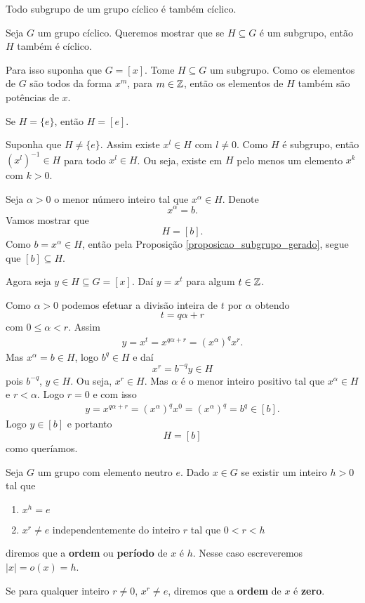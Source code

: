 \begin{proposicao}
    Todo subgrupo de um grupo cíclico é também cíclico.
\end{proposicao}
\begin{prova}
    Seja $G$ um grupo cíclico. Queremos mostrar que se $H \subseteq G$ é um subgrupo, então $H$ também é cíclico.

    Para isso suponha que $G = [x]$. Tome $H \subseteq G$ um subgrupo. Como os elementos de $G$ são todos da forma $x^m$, para $m \in \mathbb{Z}$, então os elementos de $H$ também são potências de $x$.

    Se $H = \{e\}$, então $H = [e]$.

    Suponha que $H \ne \{e\}$. Assim existe $x^l \in H$ com $l \ne 0$. Como $H$ é subgrupo, então $(x^l)^{-1} \in H$ para todo $x^l \in H$. Ou seja, existe em $H$ pelo menos um elemento $x^k$ com $k > 0$.

    Seja $\alpha > 0$ o menor número inteiro tal que $x^\alpha \in H$. Denote
    \[
        x^\alpha = b.
    \]
    Vamos mostrar que
    \[
        H = [b].
    \]
    Como $b = x^\alpha \in H$, então pela Proposição \eqref{proposicao_subgrupo_gerado}, segue que $[b] \subseteq H$.

    Agora seja $y \in H \subseteq G = [x]$. Daí $y = x^t$ para algum $t \in \mathbb{Z}$.

    Como $\alpha > 0$ podemos efetuar a divisão inteira de $t$ por $\alpha$ obtendo
    \[
        t = q\alpha + r
    \]
    com $0 \le \alpha < r$. Assim
    \begin{align*}
        y = x^t = x^{q\alpha + r} = (x^{\alpha})^qx^r.
    \end{align*}
    Mas $x^\alpha = b \in H$, logo $b^q \in H$ e daí
    \[
        x^r = b^{-q}y\in H
    \]
    pois $b^{-q}$, $y \in H$. Ou seja, $x^r \in H$. Mas $\alpha$ é o menor inteiro positivo tal que $x^\alpha \in H$ e $r < \alpha$. Logo $r = 0$ e com isso
    \begin{align*}
        y = x^{q\alpha + r} = (x^{\alpha})^qx^0 = (x^{\alpha})^q = b^q \in [b].
    \end{align*}
    Logo $y \in [b]$ e portanto
    \[
        H = [b]
    \]
    como queríamos.
\end{prova}

\begin{definicao}
    Seja $G$ um grupo com elemento neutro $e$. Dado $x \in G$ se existir um inteiro $h > 0$ tal que
    \begin{enumerate}[label={\roman*})]
        \item $x^h = e$
        \item $x^r \ne e$ independentemente do inteiro $r$ tal que $0 < r < h$
    \end{enumerate}
    diremos que a \textbf{ordem} ou \textbf{período} de $x$ é $h$. Nesse caso escreveremos $|x| = o(x) = h$.

    Se para qualquer inteiro $r \ne 0$, $x^r \ne e$, diremos que a \textbf{ordem} de $x$ é \textbf{zero}.
\end{definicao}

